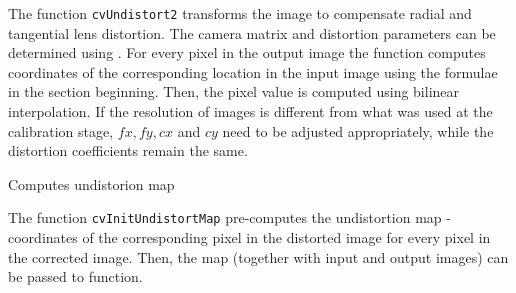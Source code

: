 \begin{description}
\end{description}

The function \texttt{cvUndistort2} transforms the image to compensate
radial and tangential lens distortion. The camera matrix and
distortion parameters can be determined using
. For every
pixel in the output image the function computes coordinates of the
corresponding location in the input image using the formulae in the
section beginning. Then, the pixel value is computed using bilinear
interpolation. If the resolution of images is different from what
was used at the calibration stage, $fx, fy, cx$ and $cy$
need to be adjusted appropriately, while the distortion coefficients
remain the same.

\label{InitUndistortMap}

Computes undistorion map


\begin{description}
\end{description}

The function \texttt{cvInitUndistortMap} pre-computes the undistortion map - coordinates of the corresponding pixel in the distorted image for every pixel in the corrected image. Then, the map (together with input and output images) can be passed to  function.


